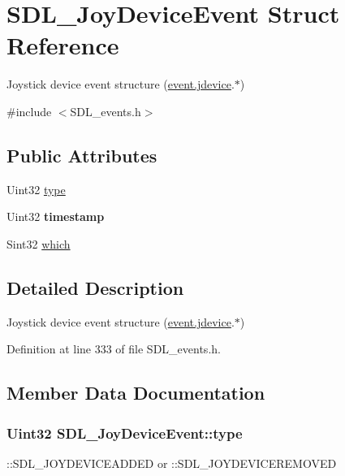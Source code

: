 \hypertarget{structSDL__JoyDeviceEvent}{\section{S\+D\+L\+\_\+\+Joy\+Device\+Event Struct Reference}
\label{structSDL__JoyDeviceEvent}
}


Joystick device event structure (\hyperlink{unionSDL__Event_a17514dc19a846ea1b5fbe44123700c4c}{event.\+jdevice}.$\ast$)  




{\ttfamily \#include $<$S\+D\+L\+\_\+events.\+h$>$}

\subsection*{Public Attributes}
\begin{DoxyCompactItemize}
\item 
Uint32 \hyperlink{structSDL__JoyDeviceEvent_a51f060ba1dd5669b458e9c97aece667e}{type}
\item 
\hypertarget{structSDL__JoyDeviceEvent_a5c4a9271bfff5d5c2e09a0dc732df8f3}{Uint32 {\bfseries timestamp}}\label{structSDL__JoyDeviceEvent_a5c4a9271bfff5d5c2e09a0dc732df8f3}

\item 
Sint32 \hyperlink{structSDL__JoyDeviceEvent_af9b295798f033b799ebbda7de6cb5a7e}{which}
\end{DoxyCompactItemize}


\subsection{Detailed Description}
Joystick device event structure (\hyperlink{unionSDL__Event_a17514dc19a846ea1b5fbe44123700c4c}{event.\+jdevice}.$\ast$) 

Definition at line 333 of file S\+D\+L\+\_\+events.\+h.



\subsection{Member Data Documentation}
\hypertarget{structSDL__JoyDeviceEvent_a51f060ba1dd5669b458e9c97aece667e}{
\subsubsection[{type}]{\setlength{\rightskip}{0pt plus 5cm}Uint32 S\+D\+L\+\_\+\+Joy\+Device\+Event\+::type}}\label{structSDL__JoyDeviceEvent_a51f060ba1dd5669b458e9c97aece667e}
\+::\+S\+D\+L\+\_\+\+J\+O\+Y\+D\+E\+V\+I\+C\+E\+A\+D\+D\+E\+D or \+::\+S\+D\+L\+\_\+\+J\+O\+Y\+D\+E\+V\+I\+C\+E\+R\+E\+M\+O\+V\+E\+D 

